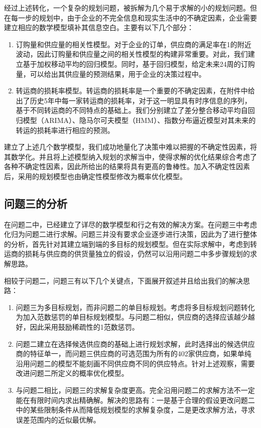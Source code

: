\documentclass{my_paper}
\begin{document}
经过上述转化，一个复杂的规划问题，被拆解为几个易于求解的小的规划问题。但在每一步的规划中，由于企业的不完全信息和现实生活中的不确定因素，企业需要建立相应的数学模型填补其信息空白。主要有以下几个部分：

\begin{enumerate}

\item 订购量和供应量的相关性模型。对于企业的订单，供应商的满足率在1的附近波动，因此订购量和供应量之间的相关性模型的构建非常重要。对此，我们建立基于加权移动平均的回归模型。同时，基于回归模型，给定未来24周的订购量，可以给出其供应量的预测结果，用于企业的决策过程中。

\item 转运商的损耗率模型。转运商的损耗率是一个重要的不确定因素，在附件中给出了历史5年中每一家转运商的损耗率，对于这一明显具有时序信息的序列，基于不同转运商的不同特点的基础上。我们分别建立了差分整合移动平均自回归模型（ARIMA）、隐马尔可夫模型（HMM）、指数分布逼近模型对其未来的转运的损耗率进行相应的预测。

\end{enumerate}

建立了上述几个数学模型，我们成功地量化了决策中难以把握的不确定性因素，将其数学化。并且将上述模型纳入规划的求解当中，使得求解的优化结果综合考虑了各种不确定性因素，因此所给出的结果将具有更高的鲁棒性。加入不确定性因素后，采用的规划模型也由确定性模型修改为概率优化模型。

\subsection{问题三的分析}

在问题二中，已经建立了详尽的数学模型和行之有效的解决方案。在问题三中考虑化归为问题二进行求解。问题三并没有要求企业逐步进行决策，因此为了进行整体的分析，首先针对其建立端到端的多目标的规划模型。但在实际求解中，考虑到转运商的损耗与供应商的供货量独立的假设，仍然可以沿用问题二中多步骤规划的求解思路。

相较于问题二，问题三有以下几个关键点，下面展开叙述并且给出我们的解决思路：

\begin{enumerate}

\item 问题三为多目标规划，而非问题二的单目标规划。考虑将多目标规划问题转化为加入范数惩罚的单目标规划模型。与问题二相似，供应商的选择应该越少越好，因此采用鼓励稀疏性的1范数惩罚。

\item 问题二建立在选择候选供应商的基础上进行规划求解，此时选择出的候选供应商的特征单一，而问题三供应商的可选范围为所有的402家供应商，如果单纯沿用问题二的模型不能刻画不同供应商不同的供应特点。针对上述观察，需要改进问题二所定义的概率优化模型。

\item 与问题二相比，问题三的求解复杂度更高。完全沿用问题二的求解方法不一定能在有限时间内求出精确解。解决的思路有：一是基于合理的假设更改问题二中的某些限制条件从而降低规划模型的求解复杂度，二是更改求解方法，寻求误差范围内的近似最优解。

\end{enumerate}
\end{document}
